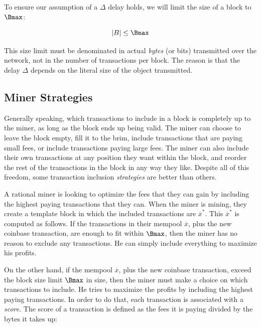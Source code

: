 To ensure our assumption of a $\Delta$ delay holds, we will limit the size of a block
to $\Bmax$:

\[
    |B| \leq \Bmax
\]

This size limit must be denominated in actual \emph{bytes} (or bits) transmitted
over the network, not in the number of transactions per block. The reason is that the delay
$\Delta$ depends on the literal size of the object transmitted.


\subsection*{Miner Strategies}

Generally speaking, which transactions to include in a block is completely up to the miner,
as long as the block ends up being valid. The miner can choose to leave the block empty,
fill it to the brim, include transactions that are paying small fees, or include transactions
paying large fees. The miner can also include their own transactions at any position they
want within the block, and reorder the rest of the transactions in the block in any way
they like. Despite all of this freedom, some transaction inclusion \emph{strategies} are better than
others.

A rational miner is looking to optimize the fees that they can gain by including the highest
paying transactions that they can. When the miner is mining, they create a template block
in which the included transactions are $\overline{x}^*$. This $\overline{x}^*$ is computed
as follows. If the transactions in their mempool $\overline{x}$, plus
the new coinbase transaction, are enough to fit within $\Bmax$, then the miner has no reason
to exclude any transactions. He can simply include everything to maximize his profits.

On the other hand, if the mempool $\overline{x}$, plus the new coinbase transaction, exceed
the block size limit $\Bmax$ in size, then the miner must make a choice on which transactions
to include. He tries to maximize the profits by including the highest paying transactions.
In order to do that, each transaction is associated with a \emph{score}.
The score of a transaction is defined as the fees it is paying divided by the bytes it takes up:

